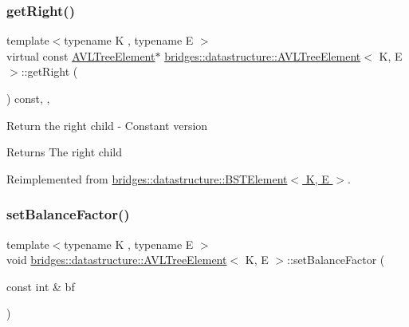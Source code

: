 \subsubsection{\texorpdfstring{get\+Right()}{getRight()}\hspace{0.1cm}{\footnotesize\ttfamily [2/2]}}
{\footnotesize\ttfamily template$<$typename K , typename E $>$ \\
virtual const \hyperlink{classbridges_1_1datastructure_1_1_a_v_l_tree_element}{A\+V\+L\+Tree\+Element}$\ast$ \hyperlink{classbridges_1_1datastructure_1_1_a_v_l_tree_element}{bridges\+::datastructure\+::\+A\+V\+L\+Tree\+Element}$<$ K, E $>$\+::get\+Right (\begin{DoxyParamCaption}{ }\end{DoxyParamCaption}) const\hspace{0.3cm}{\ttfamily [inline]}, {\ttfamily [override]}, {\ttfamily [virtual]}}

Return the right child -\/ Constant version

\begin{DoxyReturn}{Returns}
The right child 
\end{DoxyReturn}


Reimplemented from \hyperlink{classbridges_1_1datastructure_1_1_b_s_t_element_a012f0eb09c3d62b14c73109e6ded0879}{bridges\+::datastructure\+::\+B\+S\+T\+Element$<$ K, E $>$}.

\mbox{\label{classbridges_1_1datastructure_1_1_a_v_l_tree_element_a32af51a86585479c28de425374df95e9}} 
\subsubsection{\texorpdfstring{set\+Balance\+Factor()}{setBalanceFactor()}}
{\footnotesize\ttfamily template$<$typename K , typename E $>$ \\
void \hyperlink{classbridges_1_1datastructure_1_1_a_v_l_tree_element}{bridges\+::datastructure\+::\+A\+V\+L\+Tree\+Element}$<$ K, E $>$\+::set\+Balance\+Factor (\begin{DoxyParamCaption}\item[{const int \&}]{bf }\end{DoxyParamCaption})\hspace{0.3cm}{\ttfamily [inline]}}

